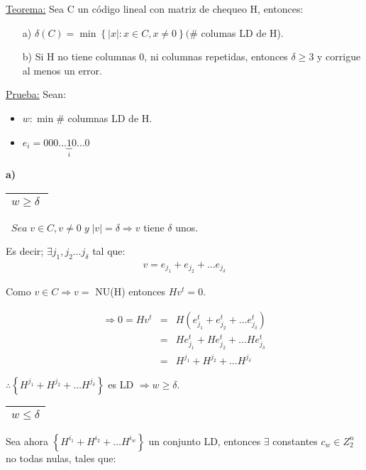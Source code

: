 \documentclass[12pt,a4paper]{report}
\newcounter{neq}
\begin{document}
		\underline{Teorema:} Sea C un código lineal con matriz de chequeo H, entonces:
		\begin{itemize}
			\item[a)] $\delta(C) = \min \left\lbrace \lvert x \rvert : x \in C , x \neq 0 \right\rbrace (\#$ columas LD de H).		
			\item[b)] Si H no tiene columnas 0, ni columnas repetidas, entonces $\delta \geq 3$ y corrigue al menos un error.
		\end{itemize}
		
		\underline{Prueba:} Sean:
		\begin{itemize}
			\item $w : \min \#$ columnas LD de H.
			\item $e_{i} = 000 \dotsc \underbrace{1}_{i} 0 \dotsc 0$ 
		\end{itemize}
		
		\textbf{a)} \begin{tabular}{|c|} \hline $w \geq \delta \; $ \\ \hline \end{tabular} $ \; \; Sea \; v \in C , v \neq 0 \; y \; \lvert v \rvert = \delta \Rightarrow v$ tiene $\delta$ unos.
		
		\vspace{3mm}
		Es decir; $\exists j_{1}, j_{2} \dotsc j_{\delta}$ tal que:
		\begin{eqnarray}
			\nonumber v = e_{j_{1}} + e_{j_{2}} + \dotsc e_{j_{\delta}}
		\end{eqnarray}
		
		Como $ v \in C \Rightarrow v =$ NU(H) entonces $Hv^{t} = 0$.
		
		\begin{eqnarray}
			\nonumber \Rightarrow 0 = Hv^{t} &=& H(e_{j_{1}}^{t} + e_{j_{2}}^{t} + \dotsc e_{j_{\delta}}^{t}) \\
			\nonumber &=& H e_{j_{1}}^{t} + H e_{j_{2}}^{t} + \dotsc H e_{j_{\delta}}^{t} \\
			\nonumber &=& H^{j_{1}} + H^{j_{2}} + \dotsc H^{j_{\delta}}
		\end{eqnarray}
		
		$\therefore \left\lbrace H^{j_{1}} + H^{j_{2}} + \dotsc H^{j_{\delta}} \right\rbrace$ es LD $\Rightarrow w \geq \delta$.
		
		\vspace{3mm}
		\begin{tabular}{|c|} \hline $w \leq \delta $ \\ \hline \end{tabular} Sea ahora $\left\lbrace H^{i_{1}} + H^{i_{2}} + \dotsc H^{i_{w}} \right\rbrace$ un conjunto LD, entonces $\exists$ constantes $c_{w} \in Z_{2}^{n}$ no todas nulas, tales que:
		
\end{document}
